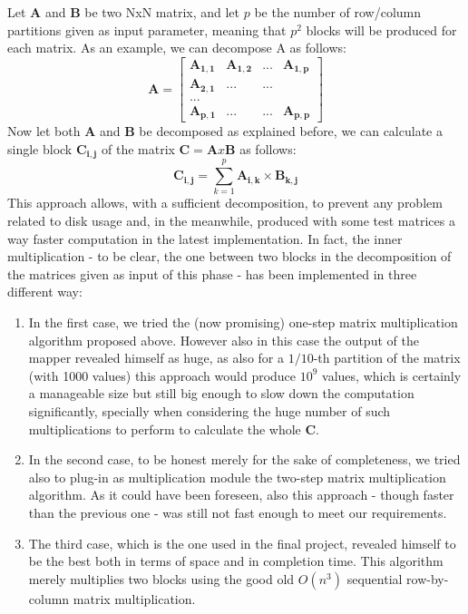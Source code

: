Let $\mathbf{A}$ and $\mathbf{B}$ be two NxN matrix, and let $p$ be the number of row/column partitions given
as input parameter, meaning that $p^2$ blocks will be produced for each matrix. As an example, we can decompose
A as follows:
$$
\mathbf{A} =
\begin{bmatrix}
    \mathbf{A_{1,1}} & \mathbf{A_{1,2}} & ... & \mathbf{A_{1,p}} \\
    \mathbf{A_{2,1}} & ... & ... \\
    ... \\
    \mathbf{A_{p,1}} & ... & ... & \mathbf{A_{p,p}}
\end{bmatrix}
$$
Now let both $\mathbf{A}$ and $\mathbf{B}$ be decomposed as explained before, we can calculate a single block $\mathbf{C_{i,j}}$
of the matrix $\mathbf{C} = \mathbf{A} x \mathbf{B}$ as follows:
$$
    \mathbf{C_{i,j}} = \sum_{k=1}^{p} \mathbf{A_{i,k}} \times \mathbf{B_{k, j}}
$$
This approach allows, with a sufficient decomposition, to prevent any problem related to disk usage and, in the meanwhile,
produced with some test matrices a way faster computation in the latest implementation.
In fact, the inner multiplication - to be clear, the one between two blocks in the decomposition of the matrices given
as input of this phase - has been implemented in three different way:
\begin{enumerate}
\item In the first case, we tried the (now promising) one-step matrix multiplication algorithm proposed above. However also in this case the output of the mapper revealed himself as huge, as also for a $1/10$-th partition of the matrix (with 1000 values) this approach would produce $10^9$ values, which is certainly a manageable size but still big enough to slow down the computation significantly, specially when considering the huge number of such multiplications to perform to calculate the whole $\mathbf{C}.$
\item In the second case, to be honest merely for the sake of completeness, we tried also to plug-in as multiplication module the two-step matrix multiplication algorithm. As it could have been foreseen, also this approach - though faster than the previous one - was still not fast enough to meet our requirements.
\item The third case, which is the one used in the final project, revealed himself to be the best both in terms of space and in completion time. This algorithm merely multiplies two blocks using the good old $O(n^3)$ sequential row-by-column matrix multiplication.
\end{enumerate}

